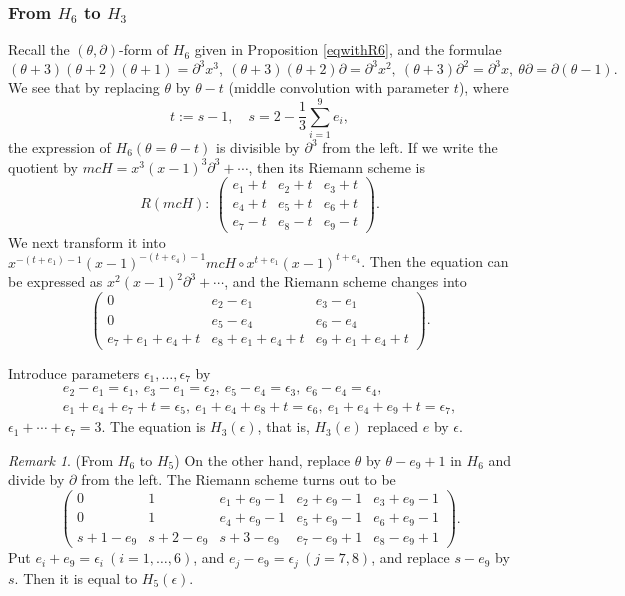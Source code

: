 \documentclass[a4paper,12pt]{article}
\theoremstyle{definition}
\theoremstyle{remark}
\newtheorem{remark}[thm]{Remark}
\numberwithin{equation}{section} %
\begin{document}
\subsubsection{From $H_6$ to $H_3$}\label{fromH6toH3}
Recall the $(\theta,\partial)$-form of $H_6$ given in Proposition \ref{eqwithR6}, and  the formulae
\[(\theta+3)(\theta+2)(\theta+1)=\partial^3x^3,       %
   \ (\theta+3)(\theta+2)\partial=\partial^3x^2,
   \ (\theta+3)\partial^2=\partial^3x,
   \ \theta\partial=\partial(\theta-1).\]
We see that  by replacing
$\theta$ by $\theta-t$ (middle convolution with parameter $t$),
where
  \[t:=s-1,\quad s=2-\frac13\sum_{i=1}^9e_i,\]
the expression of $H_6(\theta=\theta-t)$ is divisible by $\partial^3$ from the left. If we write the quotient by $mcH=x^3(x-1)^3\partial^3+\cdots$,
then its Riemann scheme is
$$R(mcH):\ \left(\begin{array}{ccc}
  e_1+t&e_2+t&e_3+t\\ e_4+t&e_5+t&e_6+t\\ e_7-t&e_8-t&e_9-t\end{array}\right).
$$
We next transform it into $x^{-(t+e_1)-1}(x-1)^{-(t+e_4)-1}mcH\circ x^{t+e_1}(x-1)^{t+e_4}$. Then the equation can be expressed as $x^2(x-1)^2\partial^3+\cdots$, and 
the Riemann scheme changes into
$$ \left(\begin{array}{ccc}
  0&e_2-e_1&e_3-e_1\\ 0&e_5-e_4&e_6-e_4\\ e_7+e_1+e_4+t&e_8+e_1+e_4+t&e_9+e_1+e_4+t
\end{array}\right).
$$

\noindent
Introduce parameters $\epsilon_1,\dots,\epsilon_7$ by
$$\begin{array}{l}
e_2 - e_1 = \epsilon_1,\  e_3 - e_1 = \epsilon_2,\  e_5 - e_4 = \epsilon_3,\  e_6 - e_4 = \epsilon_4,\\
e_1 + e_4 + e_7+t = \epsilon_5,\  e_1 + e_4 + e_8+t =\epsilon_6,\  e_1 + e_4 + e_9+t = \epsilon_7,
\end{array}$$
$ \epsilon_1+\cdots+\epsilon_7=3$. The equation is $H_3(\epsilon)$, that is, $H_3(e)$ replaced $e$ by $\epsilon$.

\begin{remark}\label{fromH6toH5}(From $H_6$ to $H_5$) 
On the other hand, replace $\theta$ by $\theta-e_9+1$ in $H_6$ and divide by $\partial$ from the left. The Riemann scheme turns out to be
$$\begin{pmatrix}
  0& 1& e_1 + e_9 - 1& e_2 + e_9 - 1& e_3 + e_9 - 1\\
  0& 1& e_4 + e_9 - 1& e_5 + e_9 - 1& e_6 + e_9 - 1\\
  s+1-e_9&s+2-e_9&s+3-e_9&e_7-e_9+1&e_8-e_9+1
\end{pmatrix}.$$
Put
  $e_i+e_9=\epsilon_i\ (i=1,\dots,6)$, and $e_j-e_9=\epsilon_j\ (j=7,8)$, and replace $s-e_9$ by $s$. Then it is equal to $H_5(\epsilon)$.
\end{remark}
 
\end{document}
